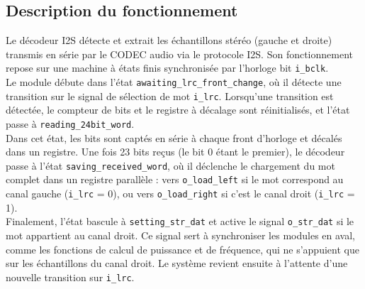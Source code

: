 

\subsection{Description du fonctionnement}

Le décodeur I2S détecte et extrait les échantillons stéréo (gauche et droite)
transmis en série par le CODEC audio via le protocole I2S. Son
fonctionnement repose sur une machine à états finis synchronisée par
l'horloge bit \verb|i_bclk|.\\

Le module débute dans l'état \verb|awaiting_lrc_front_change|, où il détecte
une transition sur le signal de sélection de mot \verb|i_lrc|. Lorsqu'une transition
est détectée, le compteur de bits et le registre à décalage sont réinitialisés,
et l'état passe à \verb|reading_24bit_word|.\\

Dans cet état, les bits sont captés en série à chaque front d'horloge et
décalés dans un registre. Une fois 23 bits reçus (le bit 0 étant le premier),
le décodeur passe à l'état \verb|saving_received_word|, où il déclenche le chargement
du mot complet dans un registre parallèle : vers \verb|o_load_left| si le mot
correspond au canal gauche (\verb|i_lrc| = 0), ou vers \verb|o_load_right| si
c'est le canal droit (\verb|i_lrc| = 1).\\

Finalement, l'état bascule à \verb|setting_str_dat| et active le signal \verb|o_str_dat| si le mot
appartient au canal droit. Ce signal sert à synchroniser les modules en aval,
comme les fonctions de calcul de puissance et de fréquence, qui ne s'appuient
que sur les échantillons du canal droit. Le système revient ensuite à l'attente
d'une nouvelle transition sur \verb|i_lrc|.\\

